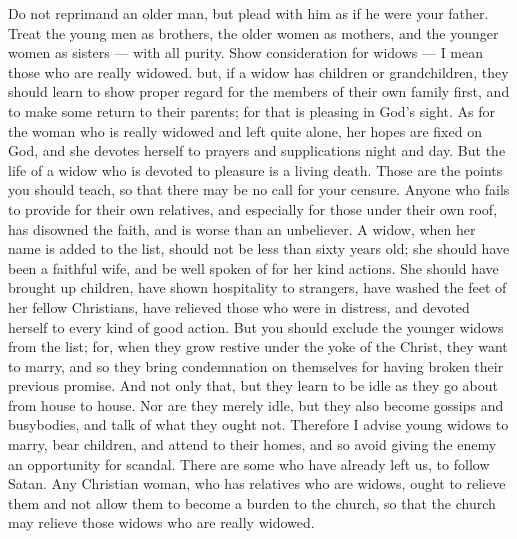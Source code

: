  Do not reprimand an older man, but plead with him as if he
were your father. Treat the young men as brothers,  the
older women as mothers, and the younger women as sisters --- with all
purity.  Show consideration for widows --- I mean those who
are really widowed.  but, if a widow has children or
grandchildren, they should learn to show proper regard for the members
of their own family first, and to make some return to their parents; for
that is pleasing in God's sight.  As for the woman who is
really widowed and left quite alone, her hopes are fixed on God, and she
devotes herself to prayers and supplications night and day. 
But the life of a widow who is devoted to pleasure is a living death.
 Those are the points you should teach, so that there may be
no call for your censure.  Anyone who fails to provide for
their own relatives, and especially for those under their own roof, has
disowned the faith, and is worse than an unbeliever.  A
widow, when her name is added to the list, should not be less than sixty
years old; she should have been a faithful wife,  and be
well spoken of for her kind actions. She should have brought up
children, have shown hospitality to strangers, have washed the feet of
her fellow Christians, have relieved those who were in distress, and
devoted herself to every kind of good action.  But you
should exclude the younger widows from the list; for, when they grow
restive under the yoke of the Christ, they want to marry, 
and so they bring condemnation on themselves for having broken their
previous promise.  And not only that, but they learn to be
idle as they go about from house to house. Nor are they merely idle, but
they also become gossips and busybodies, and talk of what they ought
not.  Therefore I advise young widows to marry, bear
children, and attend to their homes, and so avoid giving the enemy an
opportunity for scandal.  There are some who have already
left us, to follow Satan.  Any Christian woman, who has
relatives who are widows, ought to relieve them and not allow them to
become a burden to the church, so that the church may relieve those
widows who are really widowed.


